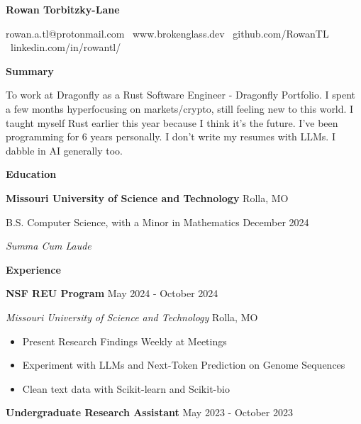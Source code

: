 \documentclass[11pt]{article}
\begin{document}
\begin{center}
    \textbf{\huge Rowan Torbitzky-Lane}\\
    \hrulefill
\end{center}

\begin{center}
    rowan.a.tl@protonmail.com \textbullet \ www.brokenglass.dev \textbullet \ github.com/RowanTL
    \textbullet \ linkedin.com/in/rowantl/
\end{center}


\begin{center}
    \textbf{Summary}
\end{center}

To work at Dragonfly as a Rust Software Engineer - Dragonfly Portfolio. I spent a few months hyperfocusing on markets/crypto, still feeling new to this world. I taught myself Rust earlier this year because I think it's the future. I've been programming for 6 years personally. I don't write my resumes with LLMs. I dabble in AI generally too.


\begin{center}
    \textbf{Education}
\end{center}
\textbf{Missouri University of Science and Technology} \hfill Rolla, MO

B.S. Computer Science, with a Minor in Mathematics \hfill December 2024

\textit{Summa Cum Laude}

\begin{center}
    \textbf{Experience}
\end{center}

\textbf{NSF REU Program} \hfill May 2024 - October 2024

\textsl{Missouri University of Science and Technology} \hfill Rolla, MO
\begin{itemize}[noitemsep]
    \item Present Research Findings Weekly at Meetings
    \item Experiment with LLMs and Next-Token Prediction on Genome Sequences
    \item Clean text data with Scikit-learn and Scikit-bio
\end{itemize}

\textbf{Undergraduate Research Assistant} \hfill May 2023 - October 2023
\end{document}
